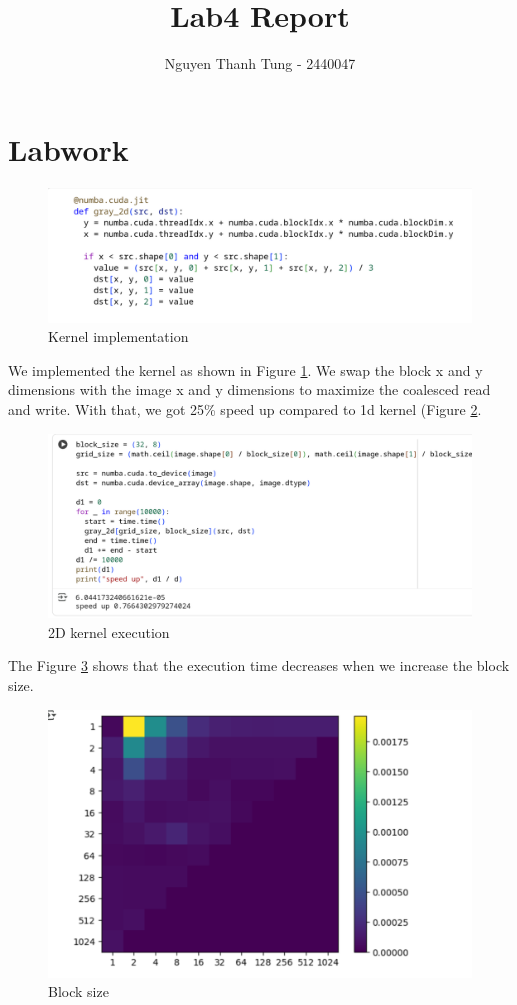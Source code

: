 \documentclass{article}
\title{Lab4 Report}
\author{Nguyen Thanh Tung - 2440047}
\begin{document}
\maketitle

\section{Labwork}

\begin{figure}[h!]
    \centering
    \includegraphics[width=1\linewidth]{impl.png}
    \caption{Kernel implementation}
    \label{fig:kernel}
\end{figure}


We implemented the kernel as shown in Figure \ref{fig:kernel}. We swap the block x and y dimensions with the image x and y dimensions to maximize the coalesced read and write. With that, we got 25\% speed up compared to 1d kernel (Figure \ref{fig:run}.

\begin{figure}[h!]
    \centering
    \includegraphics[width=0.5\linewidth]{run.png}
    \caption{2D kernel execution}
    \label{fig:run}
\end{figure}

The Figure \ref{fig:block-size} shows that the execution time decreases when we increase the block size.

\begin{figure}[h!]
    \centering
    \includegraphics[width=0.5\linewidth]{block_size.png}
    \caption{Block size}
    \label{fig:block-size}
\end{figure}
\end{document}
